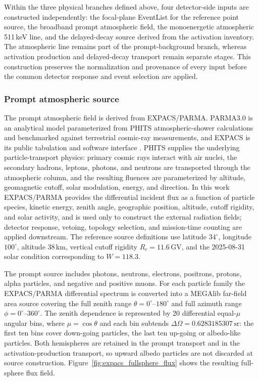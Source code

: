 \documentclass[11pt]{article}
\begin{document}
Within the three physical branches defined above, four detector-side inputs are
constructed independently: the focal-plane EventList for the reference point
source, the broadband prompt atmospheric field, the monoenergetic atmospheric
511\,keV line, and the delayed-decay source derived from the activation inventory.
The atmospheric line remains part of the prompt-background branch, whereas
activation production and delayed-decay transport remain separate stages. This
construction preserves the normalization and provenance of every input before the
common detector response and event selection are applied.

\subsubsection{Prompt atmospheric source}
\label{subsec:prompt_source}

The prompt atmospheric field is derived from EXPACS/PARMA. PARMA3.0 is an
analytical model parameterized from PHITS atmospheric-shower calculations and
benchmarked against terrestrial cosmic-ray measurements, and EXPACS is its
public tabulation and software interface
\cite{Sato2015EXPACS,Sato2016PARMA4}. PHITS supplies the underlying
particle-transport physics: primary cosmic rays interact with air nuclei, the
secondary hadrons, leptons, photons, and neutrons are transported through the
atmospheric column, and the resulting fluences are parameterized by altitude,
geomagnetic cutoff, solar modulation, energy, and direction. In this work
EXPACS/PARMA provides the differential incident flux as a function of particle
species, kinetic energy, zenith angle, geographic position, altitude, cutoff
rigidity, and solar activity, and is used only to construct the external
radiation fields; detector response, vetoing, topology selection, and
mission-time counting are applied downstream. The reference source definitions
use latitude $34^\circ$, longitude $100^\circ$, altitude $38\,\mathrm{km}$,
vertical cutoff rigidity $R_c=11.6\,\mathrm{GV}$, and the 2025-08-31 solar
condition corresponding to $W=118.3$.

The prompt source includes photons, neutrons, electrons, positrons, protons,
alpha particles, and negative and positive muons. For each particle family the
EXPACS/PARMA differential spectrum is converted into a MEGAlib far-field area
source covering the full zenith range $\theta=0^\circ$--$180^\circ$ and full
azimuth range $\phi=0^\circ$--$360^\circ$. The zenith dependence is represented
by 20 differential equal-$\mu$ angular bins, where $\mu=\cos\theta$ and each
bin subtends $\Delta\Omega=0.6283185307\,\mathrm{sr}$: the first ten bins cover
down-going particles, the last ten up-going or albedo-like particles. Both
hemispheres are retained in the prompt transport and in the
activation-production transport, so upward albedo particles are not discarded
at source construction. Figure~\ref{fig:expacs_fullsphere_flux} shows the
resulting full-sphere flux field.
\end{document}
